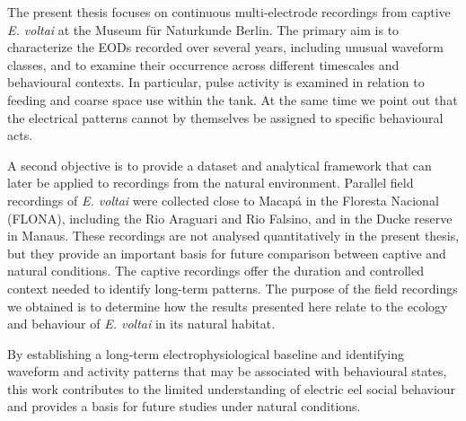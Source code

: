 The present thesis focuses on continuous multi-electrode recordings from captive \textit{E. voltai} at the Museum für Naturkunde Berlin. 
The primary aim is to characterize the EODs recorded over several years, including unusual waveform classes, and to examine their occurrence across different timescales and behavioural contexts. 
In particular, pulse activity is examined in relation to feeding and coarse space use within the tank. 
At the same time we point out that the electrical patterns cannot by themselves be assigned to specific behavioural acts.

A second objective is to provide a dataset and analytical framework that can later be applied to recordings from the natural environment. 
Parallel field recordings of \textit{E. voltai} were collected close to Macapá in the Floresta Nacional (FLONA), including the Rio Araguari and Rio Falsino, and in the Ducke reserve in Manaus. 
These recordings are not analysed quantitatively in the present thesis, but they provide an important basis for future comparison between captive and natural conditions. 
The captive recordings offer the duration and controlled context needed to identify long-term patterns. 
The purpose of the field recordings we obtained is to determine how the results presented here relate to the ecology and behaviour of \textit{E. voltai} in its natural habitat.

By establishing a long-term electrophysiological baseline and identifying waveform and activity patterns that may be associated with behavioural states, this work contributes to the limited understanding of electric
eel social behaviour and provides a basis for future studies under natural conditions.
